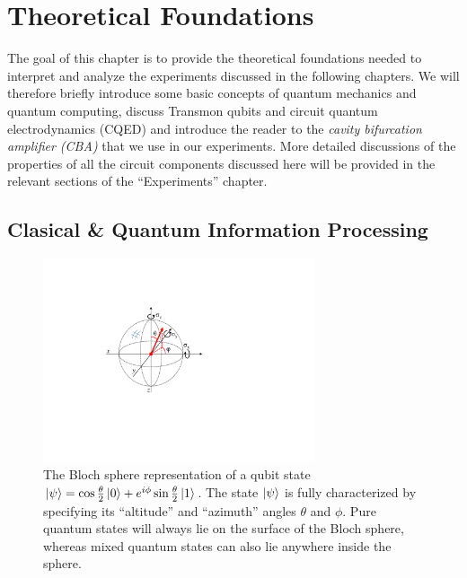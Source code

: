 \chapter{Theoretical Foundations} \label{chapter:theory}

The goal of this chapter is to provide the theoretical foundations needed to interpret and analyze the experiments discussed in the following chapters. We will therefore briefly introduce some basic concepts of quantum mechanics and quantum computing, discuss Transmon qubits and circuit quantum electrodynamics (CQED) and introduce the reader to the {\it cavity bifurcation amplifier (CBA)} that we use in our experiments. More detailed discussions of the properties of all the circuit components discussed here will be provided in the relevant sections of the ``Experiments'' chapter.

\section{Clasical \& Quantum Information Processing}

\begin{figure}
	\includegraphics[width=8cm]{"./material/figures/introduction/bloch_sphere"}
	\caption{The Bloch sphere representation of a qubit state $\left| \psi \right> = \cos{\frac{\theta}{2}}\left| 0 \right>+e^{i\phi}\sin{\frac{\theta}{2}}\left| 1 \right>$. The state $\left| \psi \right>$ is fully characterized by specifying its ``altitude'' and ``azimuth'' angles $\theta$ and $\phi$. Pure quantum states will always lie on the surface of the Bloch sphere, whereas mixed quantum states can also lie anywhere inside the sphere.}
	\label{fig:BlochSphere}
\end{figure}

